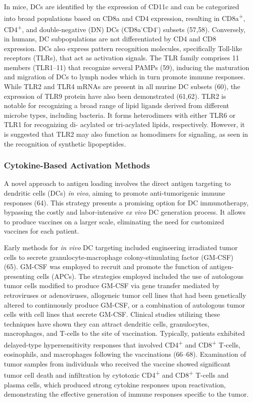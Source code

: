 \documentclass[
]{article}
\begin{document}
In mice, DCs are identified by the expression of CD11c and can be
categorized into broad populations based on CD8a and CD4 expression,
resulting in CD8a\textsuperscript{+}, CD4\textsuperscript{+}, and
double-negative (DN) DCs (CD8a\textsuperscript{-}CD4\textsuperscript{-})
subsets (57,58). Conversely, in humans, DC subpopulations are not
differentiated by CD4 and CD8 expression. DCs also express pattern
recognition molecules, specifically Toll-like receptors (TLRs), that act
as activation signals. The TLR family comprises 11 members (TLR1--11)
that recognize several PAMPs (59), inducing the maturation and migration
of DCs to lymph nodes which in turn promote immune responses. While TLR2
and TLR4 mRNAs are present in all murine DC subsets (60), the expression
of TLR9 protein have also been demonstrated (61,62). TLR2 is notable for
recognizing a broad range of lipid ligands derived from different
microbe types, including bacteria. It forms heterodimers with either
TLR6 or TLR1 for recognizing di- acylated or tri-acylated lipids,
respectively. However, it is suggested that TLR2 may also function as
homodimers for signaling, as seen in the recognition of synthetic
lipopeptides.

\subsubsection{Cytokine-Based Activation
Methods}\label{cytokine-based-activation-methods}

A novel approach to antigen loading involves the direct antigen
targeting to dendritic cells (DCs) \emph{in vivo}, aiming to promote
anti-tumorigenic immune responses (64). This strategy presents a
promising option for DC immunotherapy, bypassing the costly and
labor-intensive \emph{ex vivo} DC generation process. It allows to
produce vaccines on a larger scale, eliminating the need for customized
vaccines for each patient.

Early methods for \emph{in vivo} DC targeting included engineering
irradiated tumor cells to secrete granulocyte-macrophage
colony-stimulating factor (GM-CSF) (65). GM-CSF was employed to recruit
and promote the function of antigen-presenting cells (APCs). The
strategies employed included the use of autologous tumor cells modified
to produce GM-CSF via gene transfer mediated by retroviruses or
adenoviruses, allogeneic tumor cell lines that had been genetically
altered to continuously produce GM-CSF, or a combination of autologous
tumor cells with cell lines that secrete GM-CSF. Clinical studies
utilizing these techniques have shown they can attract dendritic cells,
granulocytes, macrophages, and T-cells to the site of vaccination.
Typically, patients exhibited delayed-type hypersensitivity responses
that involved CD4\textsuperscript{+} and CD8\textsuperscript{+} T-cells,
eosinophils, and macrophages following the vaccinations (66--68).
Examination of tumor samples from individuals who received the vaccine
showed significant tumor cell death and infiltration by cytotoxic
CD4\textsuperscript{+} and CD8\textsuperscript{+} T-cells and plasma
cells, which produced strong cytokine responses upon reactivation,
demonstrating the effective generation of immune responses specific to
the tumor.
\end{document}
